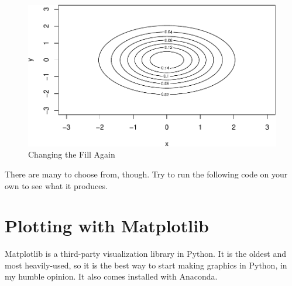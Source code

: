 \documentclass[
  12pt,
  krantz2]{krantz}
\makeatletter
\newenvironment{Shaded}{\begin{snugshade}}{\end{snugshade}}
\newcommand{\AttributeTok}[1]{\textcolor[rgb]{0.61,0.61,0.61}{#1}}
\newcommand{\DecValTok}[1]{\textcolor[rgb]{0.06,0.06,0.06}{#1}}
\newcommand{\FunctionTok}[1]{\textcolor[rgb]{0,0,0}{#1}}
\newcommand{\NormalTok}[1]{#1}
\newcommand{\OtherTok}[1]{\textcolor[rgb]{0.37,0.37,0.37}{#1}}
\newcommand{\SpecialCharTok}[1]{\textcolor[rgb]{0,0,0}{#1}}
\newenvironment{kframe}{%
\medskip{}
\setlength{\fboxsep}{.8em}
 \def\at@end@of@kframe{}%
 \ifinner\ifhmode%
  \def\at@end@of@kframe{\end{minipage}}%
  \begin{minipage}{\columnwidth}%
 \fi\fi%
 \def\FrameCommand##1{\hskip\@totalleftmargin \hskip-\fboxsep
 \colorbox{shadecolor}{##1}\hskip-\fboxsep
     \hskip-\linewidth \hskip-\@totalleftmargin \hskip\columnwidth}%
 \MakeFramed {\advance\hsize-\width
   \@totalleftmargin\z@ \linewidth\hsize
   \@setminipage}}%
 {\par\unskip\endMakeFramed%
 \at@end@of@kframe}
\renewenvironment{Shaded}{\begin{kframe}}{\end{kframe}}
\makeatother
\begin{document}
\begin{figure}

{\centering \includegraphics[width=0.8\linewidth]{r_and_python_book_files/figure-latex/unnamed-chunk-225-1} 

}

\caption{Changing the Fill Again}\label{fig:unnamed-chunk-225}
\end{figure}

There are many to choose from, though. Try to run the following code on your own to see what it produces.

\begin{Shaded}
\end{Shaded}

\hypertarget{plotting-with-matplotlib}{%
\section{Plotting with Matplotlib}\label{plotting-with-matplotlib}}

Matplotlib \citep{Hunter:2007} is a third-party visualization library in Python. It is the oldest and most heavily-used, so it is the best way to start making graphics in Python, in my humble opinion. It also comes installed with Anaconda.
\end{document}
